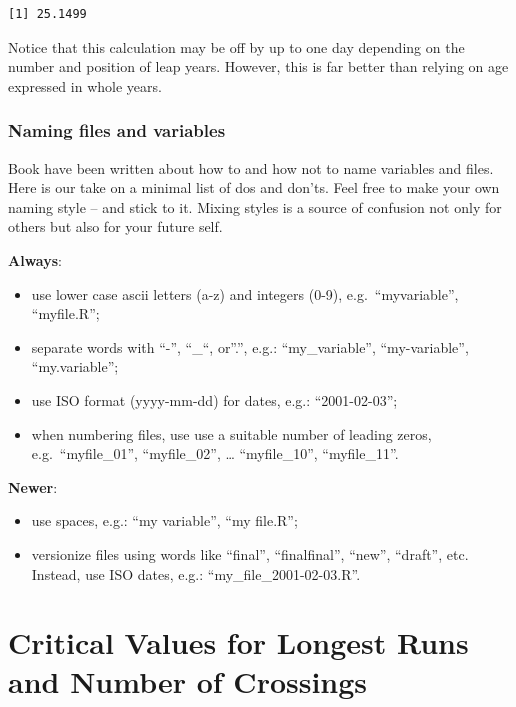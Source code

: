 \documentclass[
]{book}
\begin{document}
\begin{verbatim}
[1] 25.1499
\end{verbatim}

Notice that this calculation may be off by up to one day depending on the number and position of leap years. However, this is far better than relying on age expressed in whole years.

\subsection{Naming files and variables}\label{naming-files-and-variables}

Book have been written about how to and how not to name variables and files. Here is our take on a minimal list of dos and don'ts. Feel free to make your own naming style -- and stick to it. Mixing styles is a source of confusion not only for others but also for your future self.

\textbf{Always}:

\begin{itemize}
\item
  use lower case ascii letters (a-z) and integers (0-9), e.g.~``myvariable'', ``myfile.R'';
\item
  separate words with ``-'', ``\_``, or''.'', e.g.: ``my\_variable'', ``my-variable'', ``my.variable'';
\item
  use ISO format (yyyy-mm-dd) for dates, e.g.: ``2001-02-03'';
\item
  when numbering files, use use a suitable number of leading zeros, e.g.~``myfile\_01'', ``myfile\_02'', \ldots{} ``myfile\_10'', ``myfile\_11''.
\end{itemize}

\textbf{Newer}:

\begin{itemize}
\item
  use spaces, e.g.: ``my variable'', ``my file.R'';
\item
  versionize files using words like ``final'', ``finalfinal'', ``new'', ``draft'', etc. Instead, use ISO dates, e.g.: ``my\_file\_2001-02-03.R''.
\end{itemize}

\chapter{Critical Values for Longest Runs and Number of Crossings}\label{runs-limits}
\end{document}
